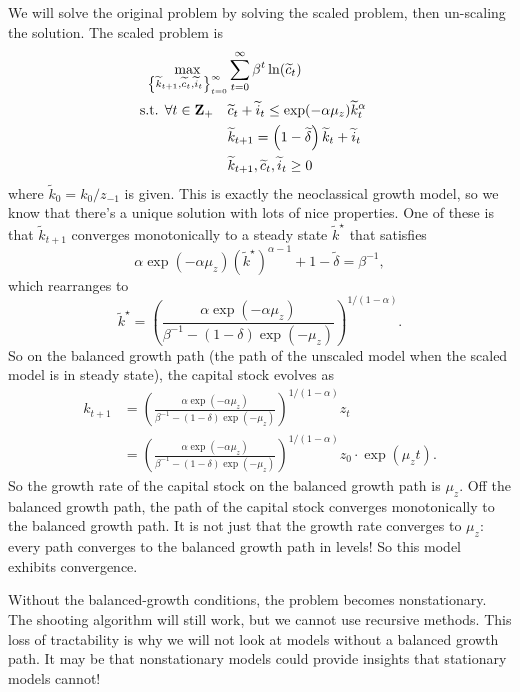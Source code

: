 \documentclass[11pt,letterpaper,reqno,oneside]{article}
\begin{document}
We will solve the original problem by solving the scaled problem, then un-scaling the solution. The scaled problem is
%
\begin{align*}
	\max_{ \left\{\widetilde{k}_{t+1},\widetilde{c}_t,\widetilde{i}_t\right\}_{t=0}^\infty }
	&\sum_{t=0}^\infty \beta^t \ln (\widetilde{c}_t) &
	\\
	\text{s.t. $\forall t \in \mathbf{Z}_+$}\quad
	&\widetilde{c}_t + \widetilde{i}_t 
	\leq \exp(-\alpha \mu_z) \widetilde{k}_t^\alpha 
	\\
	&\widetilde{k}_{t+1} = \left(1-\widetilde{\delta}\right) \widetilde{k}_t + \widetilde{i}_t 
	\\
	&\widetilde{k}_{t+1}, \widetilde{c}_t, \widetilde{i}_t \geq 0
\end{align*}
%
where $\widetilde{k}_0 = k_0 / z_{-1}$ is given. This is exactly the neoclassical growth model, so we know that there's a unique solution with lots of nice properties. One of these is that $\widetilde{k}_{t+1}$ converges monotonically to a steady state $\widetilde{k}^\star$ that satisfies
%
\begin{equation*}
	\alpha \exp(-\alpha \mu_z) 
	\left(\widetilde{k}^\star\right)^{\alpha-1} 
	+ 1-\widetilde{\delta}
	= \beta^{-1} ,
\end{equation*}
%
which rearranges to
%
\begin{equation*}
	\widetilde{k}^\star
	= \left( \frac{ \alpha \exp(-\alpha \mu_z)  }
	{ \beta^{-1} - (1-\delta) \exp(-\mu_z) } 
	\right)^{1/(1-\alpha)} .
\end{equation*}
%
So on the balanced growth path (the path of the unscaled model when the scaled model is in steady state), the capital stock evolves as
%
\begin{align*}
	k_{t+1}
	&= \left( \frac{ \alpha \exp(-\alpha \mu_z)  }
	{ \beta^{-1} - (1-\delta) \exp(-\mu_z) } 
	\right)^{1/(1-\alpha)} 
	z_t 
	\\
	&= \left( \frac{ \alpha \exp(-\alpha \mu_z)  }
	{ \beta^{-1} - (1-\delta) \exp(-\mu_z) } 
	\right)^{1/(1-\alpha)}
	z_0 \cdot \exp( \mu_z t ) .
\end{align*}
%
So the growth rate of the capital stock on the balanced growth path is $\mu_z$. Off the balanced growth path, the path of the capital stock converges monotonically to the balanced growth path. It is not just that the growth rate converges to $\mu_z$: every path converges to the balanced growth path in levels! So this model exhibits convergence.


Without the balanced-growth conditions, the problem becomes nonstationary. The shooting algorithm will still work, but we cannot use recursive methods. This loss of tractability is why we will not look at models without a balanced growth path. It may be that nonstationary models could provide insights that stationary models cannot!
\end{document}
